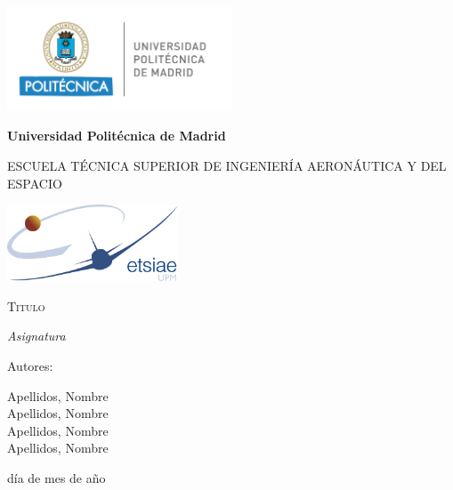 \documentclass[                         %
12pt,                                   %
a4paper,                                %
oneside                                 %
]{book}		                            %
\begin{document}
\begin{titlepage}
\centering
{\includegraphics[width=0.5\textwidth]{Logos/UPM}\par}
\vspace{0.1cm}
{\bfseries\LARGE Universidad Politécnica de Madrid \par}
\vspace{0.5cm}
{\scshape\large ESCUELA TÉCNICA SUPERIOR DE INGENIERÍA AERONÁUTICA Y DEL ESPACIO \par}
\vspace{0.25cm}
{\includegraphics[width=0.38\textwidth]{Logos/ETSIAE} \par}
\vspace{1cm}
{\scshape\Large Titulo \par}
\vspace{0.7cm}
{\itshape\large Asignatura \par}
\vfill
{\Large Autores: \par}
{\large Apellidos, Nombre \\ Apellidos, Nombre \\ Apellidos, Nombre \\ Apellidos, Nombre \par}
\vfill
{\Large día de mes de año \par}
\end{titlepage}

\frontmatter							%
{\hypersetup{linkcolor=black}	    	%
	\tableofcontents
	\cleardoublepage
	\listoffigures
	\cleardoublepage
	\listoftables
}

\printglossary[type=\acronymtype,title=Acrónimos,toctitle=Acrónimos]
\end{document}
